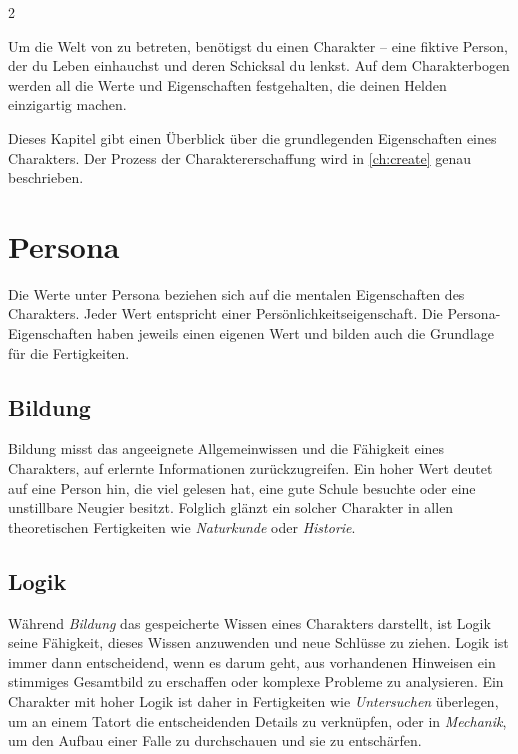 \label{ch:character}

\begin{multicols}{2}

Um die Welt von  zu betreten, benötigst du einen Charakter – eine fiktive Person, der du Leben einhauchst und deren Schicksal du lenkst. Auf dem Charakterbogen werden all die Werte und Eigenschaften festgehalten, die deinen Helden einzigartig machen.

Dieses Kapitel gibt einen Überblick über die grundlegenden Eigenschaften eines Charakters. Der Prozess der Charaktererschaffung wird in \cref{ch:create} genau beschrieben.

\section{Persona}

Die Werte unter Persona beziehen sich auf die mentalen Eigenschaften des Charakters. Jeder Wert entspricht einer Persönlichkeitseigenschaft. Die Persona-Eigenschaften haben jeweils einen eigenen Wert und bilden auch die Grundlage für die Fertigkeiten.

\subsection{Bildung}

Bildung misst das angeeignete Allgemeinwissen und die Fähigkeit eines Charakters, auf erlernte Informationen zurückzugreifen. Ein hoher Wert deutet auf eine Person hin, die viel gelesen hat, eine gute Schule besuchte oder eine unstillbare Neugier besitzt. Folglich glänzt ein solcher Charakter in allen theoretischen Fertigkeiten wie \textit{Naturkunde} oder \textit{Historie}.

\subsection{Logik}

Während \textit{Bildung} das gespeicherte Wissen eines Charakters darstellt, ist Logik seine Fähigkeit, dieses Wissen anzuwenden und neue Schlüsse zu ziehen. Logik ist immer dann entscheidend, wenn es darum geht, aus vorhandenen Hinweisen ein stimmiges Gesamtbild zu erschaffen oder komplexe Probleme zu analysieren. Ein Charakter mit hoher Logik ist daher in Fertigkeiten wie \textit{Untersuchen} überlegen, um an einem Tatort die entscheidenden Details zu verknüpfen, oder in \textit{Mechanik}, um den Aufbau einer Falle zu durchschauen und sie zu entschärfen.


\end{multicols}
